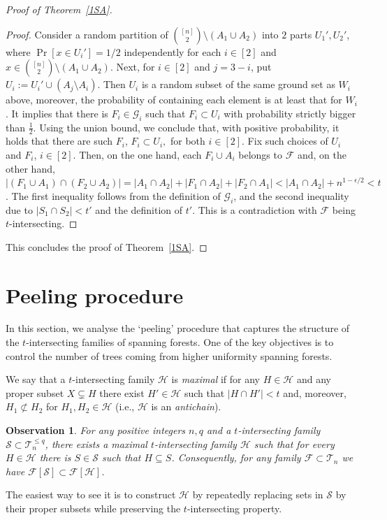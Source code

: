 \documentclass[11pt,letterpaper]{amsart}
\renewcommand{\le}{\leqslant}
\newcommand{\ff}{\mathcal{F}}
\newcommand{\s}{\mathcal{S}}
\newcommand{\g}{\mathcal{G}}
\newcommand{\h}{\mathcal H}
\newcommand{\T}{\mathcal{T}}
\newtheorem{observation}[theorem]{Observation}
\begin{document}
\begin{proof}[Proof of Theorem~\ref{1SA}]
\begin{proof}
  Consider a random partition of ${[n]\choose 2}\setminus (A_1\cup A_2)$ into $2$ parts $U_1',U_2'$, where $\Pr[x\in U_i']=1/2$ independently for each $i\in [2]$ and $x\in {[n]\choose 2}\setminus (A_1\cup A_2)$. Next, for $i\in[2]$ and $j=3-i$, put $U_i:= U_i'\cup (A_j\setminus A_i)$. Then  $U_i$ is a random subset of the same ground set as $W_i$ above, moreover, the probability of containing each element is at least that for $W_i$. It implies that there is $F_i \in \g_i$ such that $F_i\subset U_i$ with probability strictly bigger than $\frac 12$. Using the union bound, we conclude that, with positive probability, it holds that there are such $F_i$, $F_i\subset U_i,$ for both  $i \in[2]$. Fix such choices of $U_i$ and $F_i$, $i \in [2]$. Then, on the one hand, each $F_i\cup A_i$ belongs to $\ff$ and, on the other hand, $|(F_1\cup A_1)\cap (F_2\cup A_2)| =|A_1\cap A_2|+|F_1\cap A_2|+|F_2\cap A_1|< |A_1\cap A_2|+n^{1-\epsilon/2}<t$. The first inequality follows from the definition of $\g_i$, and the second inequality due to $|S_1\cap S_2|<t'$ and the definition of $t'$. This is a contradiction with $\ff$ being $t$-intersecting.
  \end{proof}
This concludes the proof of Theorem~\ref{1SA}.\end{proof}



\section{Peeling procedure}\label{sec_peel}
In this section, we analyse the `peeling' procedure that captures the structure of the $t$-intersecting families of spanning forests. One of the key objectives is to control the number of trees coming from higher uniformity spanning forests.

 We say that a $t$-intersecting family $\h$ is {\it maximal} if for any $H \in \h$ and any proper subset $X \subsetneq H$ there exist $H' \in \h$ such that $|H\cap H'|<t$ and, moreover, $H_1\not\subset H_2$ for $H_1,H_2\in \h$ (i.e., $\h$ is an {\it antichain}).

\begin{observation}\label{obs_peeling}
For any positive integers $n,q$ and a $t$-intersecting family $\s \subset \T^{\le q}_n$, there exists a maximal $t$-intersecting family $\h$  such that for every $H\in \h$ there is $S\in \s$ such that $H\subseteq S$. Consequently, for any family $\ff\subset \T_n$ we have $\ff[\s] \subset \ff[\h]$.
\end{observation}
The easiest way to see it is to construct $\h$ by repeatedly replacing sets in $\s$ by their proper subsets while preserving the $t$-intersecting property.
\end{document}
